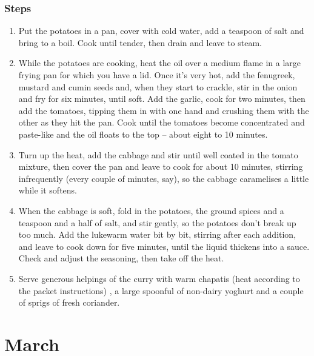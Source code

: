 \documentclass{book}
\begin{document}
\subsection*{Steps}
\begin{enumerate}
\item Put the potatoes in a pan, cover with cold water, add a teaspoon of salt and bring to a boil. Cook until tender, then drain and leave to steam.
\item While the potatoes are cooking, heat the oil over a medium flame in a large frying pan for which you have a lid. Once it’s very hot, add the fenugreek, mustard and cumin seeds and, when they start to crackle, stir in the onion and fry for six minutes, until soft. Add the garlic, cook for two minutes, then add the tomatoes, tipping them in with one hand and crushing them with the other as they hit the pan. Cook until the tomatoes become concentrated and paste-like and the oil floats to the top – about eight to 10 minutes.
\item Turn up the heat, add the cabbage and stir until well coated in the tomato mixture, then cover the pan and leave to cook for about 10 minutes, stirring infrequently (every couple of minutes, say), so the cabbage caramelises a little while it softens.
\item When the cabbage is soft, fold in the potatoes, the ground spices and a teaspoon and a half of salt, and stir gently, so the potatoes don’t break up too much. Add the lukewarm water bit by bit, stirring after each addition, and leave to cook down for five minutes, until the liquid thickens into a sauce. Check and adjust the seasoning, then take off the heat.
\item Serve generous helpings of the curry with warm chapatis (heat according to the packet instructions) , a large spoonful of non-dairy yoghurt and a couple of sprigs of fresh coriander.
\end{enumerate}
\newpage

\chapter{March}
\end{document}
